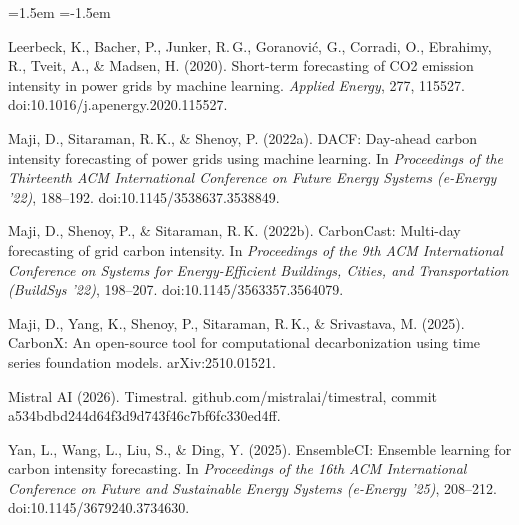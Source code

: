 \begin{list}{}{\leftmargin=1.5em \itemindent=-1.5em \itemsep=2pt}
\item Leerbeck, K., Bacher, P., Junker, R.\,G., Goranovi\'c, G., Corradi, O., Ebrahimy, R., Tveit, A., \& Madsen, H. (2020). Short-term forecasting of CO2 emission intensity in power grids by machine learning. \emph{Applied Energy}, 277, 115527. doi:10.1016/j.apenergy.2020.115527.
\item Maji, D., Sitaraman, R.\,K., \& Shenoy, P. (2022a). DACF: Day-ahead carbon intensity forecasting of power grids using machine learning. In \emph{Proceedings of the Thirteenth ACM International Conference on Future Energy Systems (e-Energy '22)}, 188--192. doi:10.1145/3538637.3538849.
\item Maji, D., Shenoy, P., \& Sitaraman, R.\,K. (2022b). CarbonCast: Multi-day forecasting of grid carbon intensity. In \emph{Proceedings of the 9th ACM International Conference on Systems for Energy-Efficient Buildings, Cities, and Transportation (BuildSys '22)}, 198--207. doi:10.1145/3563357.3564079.
\item Maji, D., Yang, K., Shenoy, P., Sitaraman, R.\,K., \& Srivastava, M. (2025). CarbonX: An open-source tool for computational decarbonization using time series foundation models. arXiv:2510.01521.
\item Mistral AI (2026). Timestral. github.com/mistralai/timestral, commit a534bdbd244d64f3d9d743f46c7bf6fc330ed4ff.
\item Yan, L., Wang, L., Liu, S., \& Ding, Y. (2025). EnsembleCI: Ensemble learning for carbon intensity forecasting. In \emph{Proceedings of the 16th ACM International Conference on Future and Sustainable Energy Systems (e-Energy '25)}, 208--212. doi:10.1145/3679240.3734630.
\end{list}
